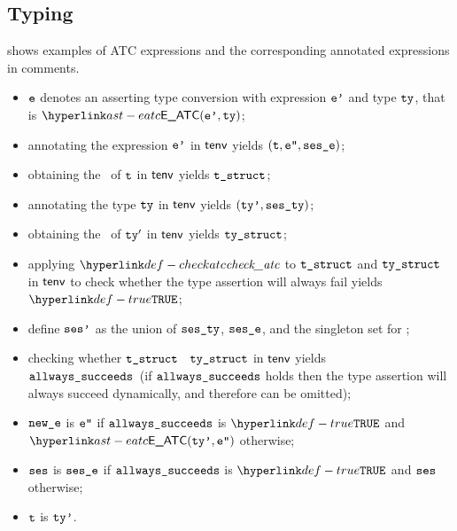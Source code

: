 \subsection{Typing}
 shows examples of ATC expressions
and the corresponding annotated expressions in comments.

\ProseParagraph
\AllApply
\begin{itemize}
  \item $\texttt{e}$ denotes an asserting type conversion with expression $\texttt{e'}$ and type $\texttt{ty}$, that is $\EATC(\vep, \tty)$;
  \item annotating the expression $\texttt{e'}$ in $\textsf{tenv}$ yields $(\texttt{t}, \texttt{e''}, \texttt{ses\_e})$\ProseOrTypeError;
  \item obtaining the \structure\ of $\texttt{t}$ in $\textsf{tenv}$ yields $\texttt{t\_struct}$\ProseOrTypeError;
  \item annotating the type $\texttt{ty}$ in $\textsf{tenv}$ yields $(\texttt{ty'}, \texttt{ses\_ty})$\ProseOrTypeError;
  \item obtaining the \structure\ of $\texttt{ty}'$ in $\textsf{tenv}$ yields $\texttt{ty\_struct}$\ProseOrTypeError;
  \item applying $\checkatc$ to $\texttt{t\_struct}$ and $\texttt{ty\_struct}$ in $\textsf{tenv}$ to check whether the type assertion
        will always fail yields $\True$\ProseOrTypeError;
  \item define $\texttt{ses'}$ as the union of $\texttt{ses\_ty}$, $\texttt{ses\_e}$, and the singleton set for \PerformsAssertions;
  \item checking whether $\texttt{t\_struct}$ \subtypesatisfies\ $\texttt{ty\_struct}$ in $\textsf{tenv}$ yields \\
        $\texttt{allways\_succeeds}$\ProseOrTypeError\
        (if $\texttt{allways\_succeeds}$ holds then the type assertion will always succeed dynamically, and therefore can be omitted);
  \item $\texttt{new\_e}$ is $\texttt{e''}$ if $\texttt{allways\_succeeds}$ is $\True$ and $\EATC(\ttyp, \vepp)$ otherwise;
  \item $\texttt{ses}$ is $\texttt{ses\_e}$ if $\texttt{allways\_succeeds}$ is $\True$ and $\texttt{ses}$ otherwise;
  \item $\texttt{t}$ is $\texttt{ty'}$.
\end{itemize}
\FormallyParagraph
